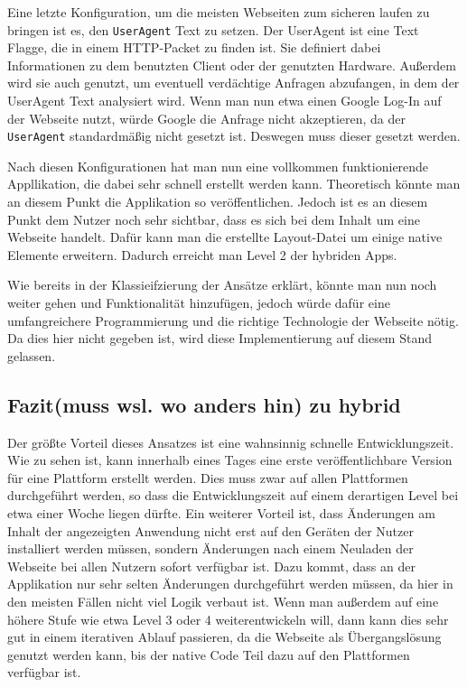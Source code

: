 Eine letzte Konfiguration, um die meisten Webseiten zum sicheren laufen zu bringen ist es, den \verb|UserAgent| Text zu setzen. Der UserAgent ist eine Text Flagge, die in einem HTTP-Packet zu finden ist. Sie definiert dabei Informationen zu dem benutzten Client oder der genutzten Hardware. Außerdem wird sie auch genutzt, um eventuell verdächtige Anfragen abzufangen, in dem der UserAgent Text analysiert wird\cite{UserAgentString}. Wenn man nun etwa einen Google Log-In auf der Webseite nutzt, würde Google die Anfrage nicht akzeptieren, da der \verb|UserAgent| standardmäßig nicht gesetzt ist. Deswegen muss dieser gesetzt werden.

Nach diesen Konfigurationen hat man nun eine vollkommen funktionierende Appllikation, die dabei sehr schnell erstellt werden kann. Theoretisch könnte man an diesem Punkt die Applikation so veröffentlichen. Jedoch ist es an diesem Punkt dem Nutzer noch sehr sichtbar, dass es sich bei dem Inhalt um eine Webseite handelt. Dafür kann man die erstellte Layout-Datei um einige native Elemente erweitern. Dadurch erreicht man Level 2 der hybriden Apps.

Wie bereits in der Klassieifzierung der Ansätze erklärt, könnte man nun noch weiter gehen und Funktionalität hinzufügen, jedoch würde dafür eine umfangreichere Programmierung und die richtige Technologie der Webseite nötig. Da dies hier nicht gegeben ist, wird diese Implementierung auf diesem Stand gelassen. 

\subsection{Fazit(muss wsl. wo anders hin) zu hybrid}
Der größte Vorteil dieses Ansatzes ist eine wahnsinnig schnelle Entwicklungszeit. Wie zu sehen ist, kann innerhalb eines Tages eine erste veröffentlichbare Version für eine Plattform erstellt werden. Dies muss zwar auf allen Plattformen durchgeführt werden, so dass die Entwicklungszeit auf einem derartigen Level bei etwa einer Woche liegen dürfte. Ein weiterer Vorteil ist, dass Änderungen am Inhalt der angezeigten Anwendung nicht erst auf den Geräten der Nutzer installiert werden müssen, sondern Änderungen nach einem Neuladen der Webseite bei allen Nutzern sofort verfügbar ist. Dazu kommt, dass an der Applikation nur sehr selten Änderungen durchgeführt werden müssen, da hier in den meisten Fällen nicht viel Logik verbaut ist. Wenn man außerdem auf eine höhere Stufe wie etwa Level 3 oder 4 weiterentwickeln will, dann kann dies sehr gut in einem iterativen Ablauf passieren, da die Webseite als Übergangslösung genutzt werden kann, bis der native Code Teil dazu auf den Plattformen verfügbar ist.

